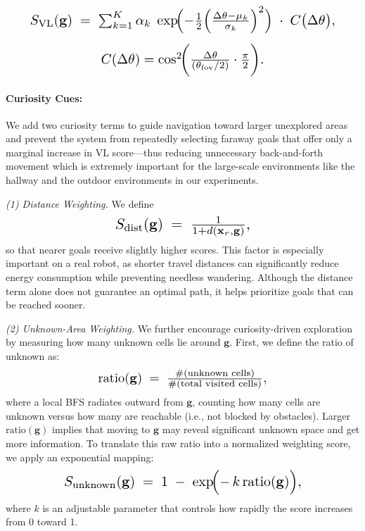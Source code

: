 \begin{equation}\label{eq:VL}
\resizebox{0.9\linewidth}{!}{$
S_{\mathrm{VL}}(\mathbf{g})
\;=\;
\sum_{k=1}^{K}
\alpha_k\;
\exp\!\Bigl(
   -\tfrac{1}{2}
   \Bigl(\tfrac{\Delta\theta - \mu_k}{\sigma_k}\Bigr)^2
\Bigr)
\;\cdot\;
C\bigl(\Delta\theta\bigr),
$}
\end{equation}

\begin{equation}\label{eq:C_theta}
\resizebox{0.48\linewidth}{!}{$
C(\Delta\theta) = \cos^2\!\biggl(\frac{\Delta\theta}{(\theta_{\mathrm{fov}}/2)} \cdot \frac{\pi}{2}\biggr).
$}
\end{equation}
\paragraph{Curiosity Cues:}
We add two curiosity terms to guide navigation toward larger unexplored areas and prevent the system from repeatedly selecting faraway goals that offer only a marginal increase in VL score—thus reducing unnecessary back-and-forth movement which is extremely important for the large-scale environments like the hallway and the outdoor environments in our experiments.

\emph{(1) Distance Weighting.} We define
\begin{equation}\label{eq:dist}
\resizebox{0.4\linewidth}{!}{$
S_{\mathrm{dist}}(\mathbf{g})
\;=\;
\frac{1}{1 + d(\mathbf{x}_r,\mathbf{g})},
$}
\end{equation}
so that nearer goals receive slightly higher scores. 
This factor is especially important on a real robot, as shorter travel distances can significantly reduce energy consumption while preventing needless wandering.
Although the distance term alone does not guarantee an optimal path, it helps prioritize goals that can be reached sooner.

\emph{(2) Unknown-Area Weighting.} We further encourage curiosity-driven exploration by measuring how many unknown cells lie around \(\mathbf{g}\). First, we define the ratio of unknown as:
\begin{equation}\label{eq:ratio}
\resizebox{0.50\linewidth}{!}{$
\mathrm{ratio}(\mathbf{g})
\;=\;
\frac{\#(\text{unknown cells})}{\#(\text{total visited cells})},
$}
\end{equation}
where a local BFS radiates outward from \(\mathbf{g}\), counting how many cells are unknown versus how many are reachable (i.e., not blocked by obstacles). Larger \(\mathrm{ratio}(\mathbf{g})\) implies that moving to \(\mathbf{g}\) may reveal significant unknown space and get more information. 
To translate this raw ratio into a normalized weighting score, we apply an exponential mapping:
\begin{equation}\label{eq:unknown}
\resizebox{0.70\linewidth}{!}{$
S_{\mathrm{unknown}}(\mathbf{g})
\;=\;
1 \;-\;
\exp\!\Bigl(
   -\,k\,\mathrm{ratio}(\mathbf{g})
\Bigr),
$}
\end{equation}
where $k$ is  an adjustable parameter that controls how rapidly the score increases from 0 toward 1. 


